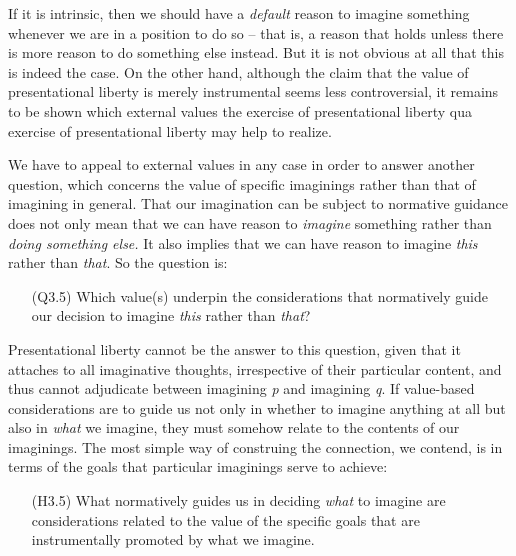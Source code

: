 \noindent If it is intrinsic, then we should have a \emph{default} reason to imagine something whenever we are in a position to do so -- that is, a reason that holds unless there is more reason to do something else instead. But it is not obvious at all that this is indeed the case. On the other hand, although the claim that the value of presentational liberty is merely instrumental seems less controversial, it remains to be shown which external values the exercise of presentational liberty qua exercise of presentational liberty may help to realize.

We have to appeal to external values in any case in order to answer another question, which concerns the value of specific imaginings rather than that of imagining in general. That our imagination can be subject to normative guidance does not only mean that we can have reason to \emph{imagine} something rather than \emph{doing something else.} It also implies that we can have reason to imagine \emph{this} rather than \emph{that}. So the question is:

\vspace{-.1cm}
\begin{itemize}[leftmargin=2cm]
\item[(Q3.5)] Which value(s) underpin the considerations that normatively guide our decision to imagine \emph{this} rather than \emph{that}?
\end{itemize}
\vspace{-.1cm}

\noindent Presentational liberty cannot be the answer to this question, given that it attaches to all imaginative thoughts, irrespective of their particular content, and thus cannot adjudicate between imagining \emph{p} and imagining \emph{q}. If value-based considerations are to guide us not only in whether to imagine anything at all but also in \emph{what} we imagine, they must somehow relate to the contents of our imaginings. The most simple way of construing the connection, we contend, is in terms of the goals that particular imaginings serve to achieve:

\vspace{-.1cm}
\begin{itemize}[leftmargin=2cm]
\item[(H3.5)] What normatively guides us in deciding \emph{what} to imagine are considerations related to the value of the specific goals that are instrumentally promoted by what we imagine.
\end{itemize}
\vspace{-.1cm}

